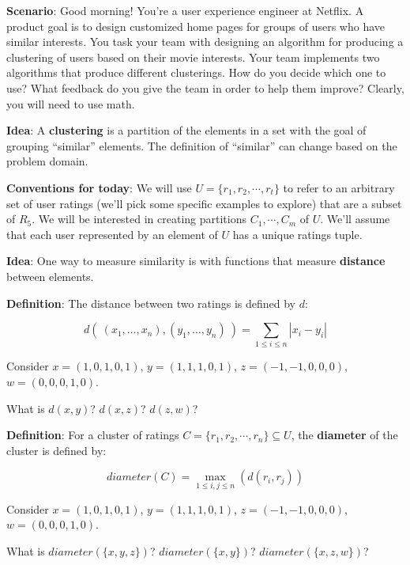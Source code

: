 



{\bf Scenario}: Good morning! You're a user experience engineer at Netflix. A
product goal is to design customized home pages for groups of users who have
similar interests. You task your team with designing an algorithm for
producing a clustering of users based on their movie interests. Your team
implements two algorithms that produce different clusterings. How do you
decide which one to use? What feedback do you give the team in order to help
them improve? Clearly, you will need to use math.


{\bf Idea}: A {\bf clustering} is a partition of the elements in a set with the goal of grouping ``similar'' elements. The definition of ``similar'' can change based on the problem domain.


{\bf Conventions for today}: We will use $U = \{r_1, r_2, \cdots, r_t\}$ to refer to an arbitrary set of user ratings (we'll pick some specific examples to explore) that are a subset of $R_5$. We will be interested in creating partitions $C_1, \cdots, C_m$ of $U$. We'll assume that each user represented by an element of $U$ has a unique ratings tuple.

{\bf Idea}: One way to measure similarity is with functions that measure {\bf distance} between elements.

{\bf Definition}: The distance between two ratings is defined by $d$:

$$d(~ (x_1, \ldots, x_n) , (y_1, \ldots, y_n) ~) =  \displaystyle \sum_{1 \leq i \leq n} | x_i - y_i |$$

Consider $x = (1, 0, 1, 0, 1)$, $y = (1, 1, 1, 0, 1)$, $z = (-1, -1, 0, 0, 0)$, $w = (0, 0, 0, 1, 0)$.

What is $d(x, y)$? $d(x, z)$? $d(z, w)$?

\vfill

\newpage

{\bf Definition}: For a cluster of ratings $C = \{r_1, r_2, \cdots, r_n \} \subseteq U$, the {\bf diameter} of the cluster is defined by:

$$\textit{diameter}(C) = \max_{1 \leq i, j \leq n} (d(r_i, r_j))$$ 

Consider $x = (1, 0, 1, 0, 1)$, $y = (1, 1, 1, 0, 1)$, $z = (-1, -1, 0, 0, 0)$, $w = (0, 0, 0, 1, 0)$.

What is $\textit{diameter}(\{x, y, z\})$? $\textit{diameter}(\{x, y\})$? $\textit{diameter}(\{x, z, w\})$?


